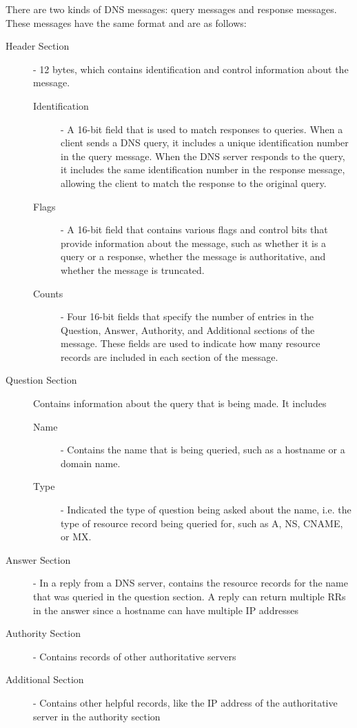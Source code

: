 \documentclass[12pt letter]{report}
\begin{document}
There are two kinds of DNS messages: query messages and response
messages. These messages have the same format and are as follows:
\begin{description}
  \item[Header Section] - 12 bytes, which contains identification and
    control information about the message.
    \begin{description}
      \item[Identification] - A 16-bit field that is used to match responses to
        queries. When a client sends a DNS query, it includes a unique
        identification number in the query message. When the DNS server
        responds to the query, it includes the same identification number
        in the response message, allowing the client to match the response
        to the original query.
      \item[Flags] -  A 16-bit field that contains various flags and
        control bits that
        provide information about the message, such as whether it is a
        query or a response, whether the message is authoritative, and
        whether the message is truncated.
      \item[Counts] -  Four 16-bit fields that specify the number of
        entries in the Question, Answer, Authority, and Additional
        sections of the message. These fields are used to indicate how
        many resource records are included in each section of the
        message.
    \end{description}
  \item[Question Section] Contains information about the query that
    is being made. It includes
    \begin{description}
      \item[Name] - Contains the name that is being queried, such as
        a hostname or a domain name.
      \item[Type] - Indicated the type of question being asked about
        the name, i.e. the type of resource record being queried for,
        such as A, NS, CNAME, or MX.
    \end{description}
  \item[Answer Section] - In a reply from a DNS server, contains the
    resource records for the name that was queried in the question
    section. A reply can return multiple RRs in the answer since a
    hostname can have multiple IP addresses
  \item[Authority Section] - Contains records of other authoritative servers
  \item[Additional Section] - Contains other helpful records, like
    the IP address of the authoritative server in the authority section
\end{description}
\end{document}
